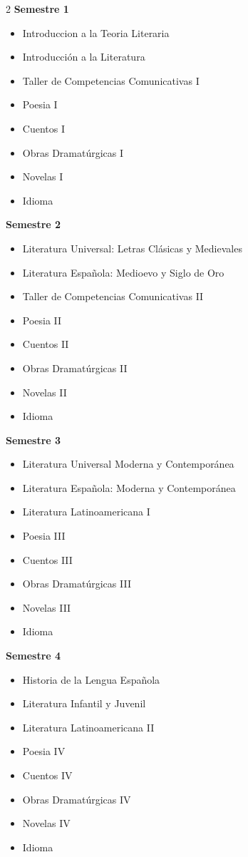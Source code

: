 \documentclass[12pt,a4paper]{article}
\begin{document}
	\begin{multicols}{2}
		\textbf{Semestre 1}
		\begin{itemize}
			\item Introduccion a la Teoria Literaria
			\item Introducción a la Literatura
			\item Taller de Competencias Comunicativas I
			\item Poesia I
			\item Cuentos I
			\item Obras Dramatúrgicas I
			\item Novelas I
			\item Idioma
		\end{itemize}
		
		\textbf{Semestre 2}
		\begin{itemize}
			\item Literatura Universal: Letras Clásicas y Medievales
			\item Literatura Española: Medioevo y Siglo de Oro
			\item Taller de Competencias Comunicativas II
			\item Poesia II
			\item Cuentos II
			\item Obras Dramatúrgicas II
			\item Novelas II
			\item Idioma
		\end{itemize}
		
		\textbf{Semestre 3}
		\begin{itemize}
			\item Literatura Universal Moderna y Contemporánea
			\item Literatura Española: Moderna y Contemporánea
			\item Literatura Latinoamericana I
			\item Poesia III
			\item Cuentos III
			\item Obras Dramatúrgicas III
			\item Novelas III
			\item Idioma
		\end{itemize}
		
		\textbf{Semestre 4}
		\begin{itemize}
			\item Historia de la Lengua Española
			\item Literatura Infantil y Juvenil
			\item Literatura Latinoamericana II
			\item Poesia IV
			\item Cuentos IV
			\item Obras Dramatúrgicas IV
			\item Novelas IV
			\item Idioma
		\end{itemize}
		

\end{multicols}
\end{document}
